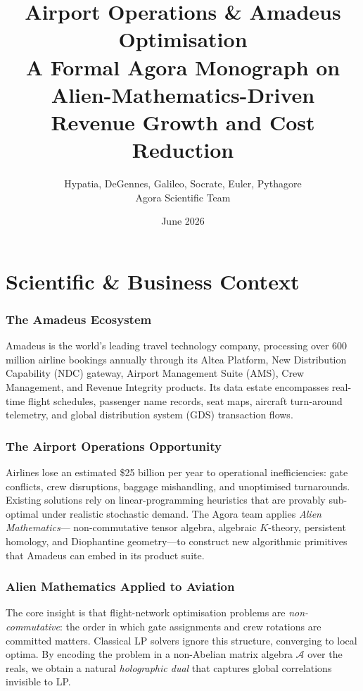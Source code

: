 \documentclass[11pt,a4paper]{article}
\title{\Huge Airport Operations \& Amadeus Optimisation\\
       \large A Formal Agora Monograph on Alien-Mathematics-Driven\\
       Revenue Growth and Cost Reduction}
\author{Hypatia, DeGennes, Galileo, Socrate, Euler, Pythagore\\
        \small Agora Scientific Team}
\date{June 2026}
\begin{document}
\maketitle
\tableofcontents
\newpage
\part{Scientific \& Business Context}
\section{The Amadeus Ecosystem}
Amadeus is the world's leading travel technology company, processing over 600 million
airline bookings annually through its Altea Platform, New Distribution Capability (NDC)
gateway, Airport Management Suite (AMS), Crew Management, and Revenue Integrity products.
Its data estate encompasses real-time flight schedules, passenger name records, seat maps,
aircraft turn-around telemetry, and global distribution system (GDS) transaction flows.

\section{The Airport Operations Opportunity}
Airlines lose an estimated \$25 billion per year to operational inefficiencies:
gate conflicts, crew disruptions, baggage mishandling, and unoptimised turnarounds.
Existing solutions rely on linear-programming heuristics that are provably sub-optimal
under realistic stochastic demand. The Agora team applies \emph{Alien Mathematics}---
non-commutative tensor algebra, algebraic $K$-theory, persistent homology, and
Diophantine geometry---to construct new algorithmic primitives that Amadeus can embed
in its product suite.

\section{Alien Mathematics Applied to Aviation}
The core insight is that flight-network optimisation problems are \emph{non-commutative}:
the order in which gate assignments and crew rotations are committed matters. Classical
LP solvers ignore this structure, converging to local optima. By encoding the problem
in a non-Abelian matrix algebra $\mathcal{A}$ over the reals, we obtain a natural
\emph{holographic dual} that captures global correlations invisible to LP.

\newpage
\end{document}
